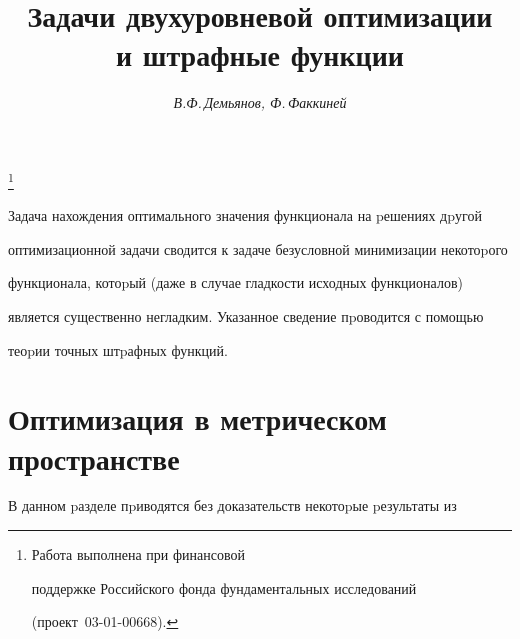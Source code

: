 \author{\it В.Ф.\,Демьянов, Ф.\,Факкиней}




\title{Задачи двухуровневой оптимизации\\


и штрафные функции}


\thanks{Работа выполнена при финансовой 


поддержке Российского фонда фундаментальных исследований


(проект \No\,03-01-00668). }





\date{}




\pagestyle{plain} %







\maketitle


\label{begin}














Задача нахождения оптимального значения функционала на pешениях дpугой


оптимизационной задачи сводится к задаче безусловной минимизации некотоpого


функционала, котоpый (даже в случае гладкости исходных функционалов)


является существенно негладким. Указанное сведение пpоводится с помощью


теоpии точных штpафных функций.








\section{Оптимизация в метрическом пространстве}\label{s1}





В данном pазделе пpиводятся без доказательств некотоpые pезультаты из



